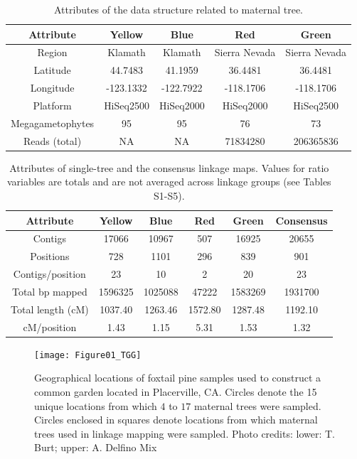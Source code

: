 \documentclass[smallextended]{svjour3}
\begin{document}
\clearpage
\begin{landscape}

\begin{table}[ht]
\centering
\begin{tabular}{ccccc}
\toprule
Attribute & Yellow & Blue & Red & Green\\
\midrule
Region & Klamath & Klamath & Sierra Nevada & Sierra Nevada \\
Latitude & 44.7483 & 41.1959 & 36.4481 & 36.4481 \\
Longitude & -123.1332 & -122.7922 & -118.1706 & -118.1706 \\
Platform & HiSeq2500 & HiSeq2000 & HiSeq2000 & HiSeq2500 \\
Megagametophytes & 95 & 95 & 76 & 73 \\
Reads (total) & NA & NA & 71834280 & 206365836 \\
\bottomrule
\end{tabular}
\caption{Attributes of the data structure related to maternal tree.} 
\label{t:label}
\end{table}
\end{landscape}

\clearpage
\begin{landscape}

\begin{table}[ht]
\centering
\begin{tabular}{cccccc}
\toprule
Attribute & Yellow & Blue & Red & Green & Consensus \\
\midrule
Contigs & 17066 & 10967 & 507 & 16925 & 20655 \\
Positions & 728 & 1101 & 296 & 839 & 901 \\
Contigs/position & 23 & 10 & 2 & 20 & 23 \\
Total bp mapped & 1596325 & 1025088 & 47222 & 1583269 & 1931700 \\
Total length (cM) & 1037.40 & 1263.46 & 1572.80 & 1287.48 & 1192.10 \\
cM/position & 1.43 & 1.15 & 5.31 & 1.53 & 1.32 \\
\bottomrule
\end{tabular}
\caption{Attributes of single-tree and the consensus linkage maps. Values for ratio variables are totals and are not averaged 
across linkage groups (see Tables S1-S5).} 
\label{t:label}
\end{table}
\end{landscape}

\clearpage

\begin{figure}[ht]
\centering
\texttt{[image: Figure01\_TGG]}
\caption{Geographical locations of foxtail pine samples used to construct a common garden located in Placerville, CA. Circles 
denote the 15 unique locations from which $4$ to $17$ maternal trees were sampled. Circles enclosed in squares denote 
locations from which maternal trees used in linkage mapping were sampled. Photo credits: lower: T. Burt; upper: A. Delfino Mix}
\label{f:Figure01_TGG}
\end{figure}
\end{document}
